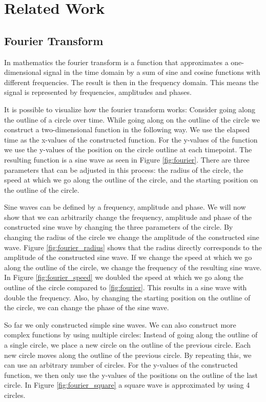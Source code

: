 \documentclass[thesis.tex]{subfiles}
\begin{document}
\chapter{Related Work}
\section{Fourier Transform} \label{fourier_transform}

In mathematics the fourier transform \cite{nixon2012feature} is a function that approximates a one-dimensional signal in the time domain by a sum of sine and cosine functions with different frequencies. The result is then in the frequency domain. This means the signal is represented by frequencies, amplitudes and phases.

It is possible to visualize how the fourier transform works: Consider going along the outline of a circle over time. While going along on the outline of the circle we construct a two-dimensional function in the following way. We use the elapsed time as the x-values of the constructed function. For the y-values of the function we use the y-values of the position on the circle outline at each timepoint. The resulting function is a sine wave as seen in Figure \ref{fig:fourier}. There are three parameters that can be adjusted in this process: the radius of the circle, the speed at which we go along the outline of the circle, and the starting position on the outline of the circle.

Sine waves can be defined by a frequency, amplitude and phase. We will now show that we can arbitrarily change the frequency, amplitude and phase of the constructed sine wave by changing the three parameters of the circle. By changing the radius of the circle we change the amplitude of the constructed sine wave. Figure \ref{fig:fourier_radius} shows that the radius directly corresponds to the amplitude of the constructed sine wave. If we change the speed at which we go along the outline of the circle, we change the frequency of the resulting sine wave. In Figure \ref{fig:fourier_speed} we doubled the speed at which we go along the outline of the circle compared to \ref{fig:fourier}. This results in a sine wave with double the frequency. Also, by changing the starting position on the outline of the circle, we can change the phase of the sine wave.

So far we only constructed simple sine waves. We can also construct more complex functions by using multiple circles: Instead of going along the outline of a single circle, we place a new circle on the outline of the previous circle. Each new circle moves along the outline of the previous circle. By repeating this, we can use an arbitrary number of circles. For the y-values of the constructed function, we then only use the y-values of the positions on the outline of the last circle. In Figure \ref{fig:fourier_square} a square wave is approximated by using 4 circles. 
\end{document}
